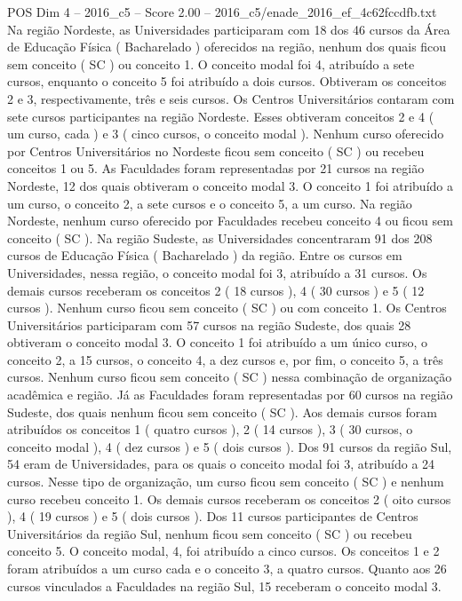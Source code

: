 \begin{textsample}{POS Dim 4 – 2016\_c5 – Score 2.00 – 2016\_c5/enade\_2016\_ef\_4c62fccdfb.txt}
Na região Nordeste, as Universidades participaram com 18 dos 46 cursos da Área de Educação Física ( Bacharelado ) oferecidos na região, nenhum dos quais ficou sem conceito ( SC ) ou conceito 1.
O conceito modal foi 4, atribuído a sete cursos, enquanto o conceito 5 foi atribuído a dois cursos.
Obtiveram os conceitos 2 e 3, respectivamente, três e seis cursos.
Os Centros Universitários contaram com sete cursos participantes na região Nordeste.
Esses obtiveram conceitos 2 e 4 ( um curso, cada ) e 3 ( cinco cursos, o conceito modal ).
Nenhum curso oferecido por Centros Universitários no Nordeste ficou sem conceito ( SC ) ou recebeu conceitos 1 ou 5.
As Faculdades foram representadas por 21 cursos na região Nordeste, 12 dos quais obtiveram o conceito modal 3.
O conceito 1 foi atribuído a um curso, o conceito 2, a sete cursos e o conceito 5, a um curso.
Na região Nordeste, nenhum curso oferecido por Faculdades recebeu conceito 4 ou ficou sem conceito ( SC ).
Na região Sudeste, as Universidades concentraram 91 dos 208 cursos de Educação Física ( Bacharelado ) da região.
Entre os cursos em Universidades, nessa região, o conceito modal foi 3, atribuído a 31 cursos.
Os demais cursos receberam os conceitos 2 ( 18 cursos ), 4 ( 30 cursos ) e 5 ( 12 cursos ).
Nenhum curso ficou sem conceito ( SC ) ou com conceito 1.
Os Centros Universitários participaram com 57 cursos na região Sudeste, dos quais 28 obtiveram o conceito modal 3.
O conceito 1 foi atribuído a um único curso, o conceito 2, a 15 cursos, o conceito 4, a dez cursos e, por fim, o conceito 5, a três cursos.
Nenhum curso ficou sem conceito ( SC ) nessa combinação de organização acadêmica e região.
Já as Faculdades foram representadas por 60 cursos na região Sudeste, dos quais nenhum ficou sem conceito ( SC ).
Aos demais cursos foram atribuídos os conceitos 1 ( quatro cursos ), 2 ( 14 cursos ), 3 ( 30 cursos, o conceito modal ), 4 ( dez cursos ) e 5 ( dois cursos ).
Dos 91 cursos da região Sul, 54 eram de Universidades, para os quais o conceito modal foi 3, atribuído a 24 cursos.
Nesse tipo de organização, um curso ficou sem conceito ( SC ) e nenhum curso recebeu conceito 1.
Os demais cursos receberam os conceitos 2 ( oito cursos ), 4 ( 19 cursos ) e 5 ( dois cursos ).
Dos 11 cursos participantes de Centros Universitários da região Sul, nenhum ficou sem conceito ( SC ) ou recebeu conceito 5.
O conceito modal, 4, foi atribuído a cinco cursos.
Os conceitos 1 e 2 foram atribuídos a um curso cada e o conceito 3, a quatro cursos.
Quanto aos 26 cursos vinculados a Faculdades na região Sul, 15 receberam o conceito modal 3.

\end{textsample}
